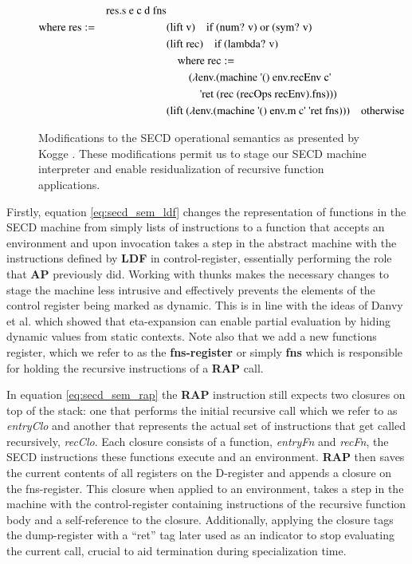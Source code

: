 \documentclass[a4paper,12pt,twoside,openright]{report}
\theoremstyle{definition}
\newcommand{\ts}{\textquotesingle}
\begin{document}
\begin{figure}[ht!]
\begin{alignat}{5}
		 && \text{res.s e c d fns}   \\
		 \text{where res} & := && \text{(lift v)\quad if (num? v) or (sym? v)} \nonumber \\
		 & && \text{(lift rec)} \quad \text{if (lambda? v)} \nonumber \\
		 & && \quad \text{where rec} := \nonumber \\ 
		 & && \qquad\text{($\lambda$env.(machine {\ts}() env.recEnv c{\ts}} \nonumber \\
		 & && \qquad\quad \text{{\ts}ret (rec (recOps recEnv).fns)))} \nonumber \\
		 & && \text{(lift ($\lambda$env.(machine {\ts}() env.m c{\ts} {\ts}ret fns)))} \quad\text{otherwise} \nonumber
\end{alignat}
\caption{Modifications to the SECD operational semantics as presented by Kogge \cite{kogge1990architecture}. These modifications permit us to stage our SECD machine interpreter and enable residualization of recursive function applications.}
\label{fig:secd_semantics_noset}
\end{figure}
\endgroup

Firstly, equation \ref{eq:secd_sem_ldf} changes the representation of functions in the SECD machine from simply lists of instructions to a function that accepts an environment and upon invocation takes a step in the abstract machine with the instructions defined by \textbf{LDF} in control-register, essentially performing the role that \textbf{AP} previously did. Working with thunks makes the necessary changes to stage the machine less intrusive and effectively prevents the elements of the control register being marked as dynamic. This is in line with the ideas of Danvy et al. \cite{danvy1995essence} which showed that eta-expansion can enable partial evaluation by hiding dynamic values from static contexts. Note also that we add a new functions register, which we refer to as the \textbf{fns-register} or simply \textbf{fns} which is responsible for holding the recursive instructions of a \textbf{RAP} call.

In equation \ref{eq:secd_sem_rap} the \textbf{RAP} instruction still expects two closures on top of the stack: one that performs the initial recursive call which we refer to as \textit{entryClo} and another that represents the actual set of instructions that get called recursively, \textit{recClo}. Each closure consists of a function, \textit{entryFn} and \textit{recFn}, the SECD instructions these functions execute and an environment. \textbf{RAP} then saves the current contents of all registers on the D-register and appends a closure on the fns-register. This closure when applied to an environment, takes a step in the machine with the control-register containing instructions of the recursive function body and a self-reference to the closure. Additionally, applying the closure tags the dump-register with a ``ret'' tag later used as an indicator to stop evaluating the current call, crucial to aid termination during specialization time.
\end{document}
